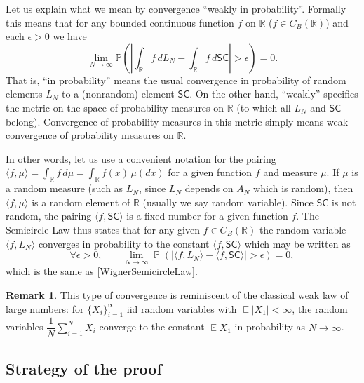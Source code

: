 \documentclass[letterpaper,11pt,oneside,reqno]{amsart}
\numberwithin{equation}{section}
\newcounter{lecture}
\newcommand{\lect}[1]{\bigskip\addtocounter{lecture}{1}\noindent{\Large\textbf{\color{red}Lecture \#\arabic{lecture} on #1 \hrulefill}}\bigskip}
\newcommand{\SC}{\mathsf{SC}}
\DeclareMathOperator{\EE}{\mathbb{E}}
\DeclareMathOperator{\PP}{\mathbb{P}}
\theoremstyle{definition}
\newtheorem{remark}[proposition]{Remark}
\begin{document}
Let us explain what we mean by convergence ``weakly in probability''. Formally this means that
for any bounded continuous function $f$ on $\mathbb R$ ($f\in C_B(\mathbb R)$) and each $\epsilon>0$ we have 
\begin{equation}\label{WignerSemicircleLaw}
\lim_{N\to\infty}\mathbb P\left(\left|\int_{\mathbb R} f\,dL_N-\int_{\mathbb R} f\,d\SC\right|>\epsilon\right)=0.
\end{equation}
That is, ``in probability'' means the usual convergence in probability  of
random elements $L_N$ to a (nonrandom) element $\SC$.  On the other hand,
``weakly'' specifies the metric on the space of probability measures on
$\mathbb{R}$ (to which all $L_N$ and $\SC$ belong). Convergence of probability
measures in this metric simply means weak convergence of probability measures
on $\mathbb{R}$.

In other words,
let us use a convenient notation for the pairing $\langle f,\mu\rangle
=\int_{\mathbb R} f\,d\mu=\int_{\mathbb R}f(x)\,\mu(dx)$ for a given
function $f$ and measure $\mu$.  If $\mu$ is a random measure (such as $L_N$,
since $L_N$ depends on $A_N$ which is random), then $\langle f,\mu\rangle$ is
a random element of $\mathbb R$ (usually we say random variable).  Since $\SC$
is not random, the pairing $\langle f,\SC\rangle$ is a fixed number for a given function $f$.  The
Semicircle Law thus states that for any given $f\in C_B(\mathbb R)$ the random variable
$\langle f,L_N\rangle$ converges in probability to the constant $\langle f,\SC\rangle$ which may be written as
\begin{equation}\label{WignerSemicircleLaw_langle}
\forall \epsilon>0,\qquad \lim_{N\to\infty}\PP\left(\left|\langle f,L_N\rangle-\langle f,\SC\rangle\right|>\epsilon\right)=0,
\end{equation}
which is the same as \eqref{WignerSemicircleLaw}.

\begin{remark}
	This type of convergence is reminiscent of the classical weak law of large numbers: for
	$\{X_i\}_{i=1}^\infty$ iid random variables with $\EE|X_1| <\infty$, the random
	variables $\dfrac{1}N\sum_{i=1}^N X_i$ converge to the constant $\EE X_1$ in probability as $N\to\infty$.
\end{remark}


\lect{1/25/2016}

\subsection{Strategy of the proof} %
\label{sub:strategy_of_the_proof}
\end{document}
